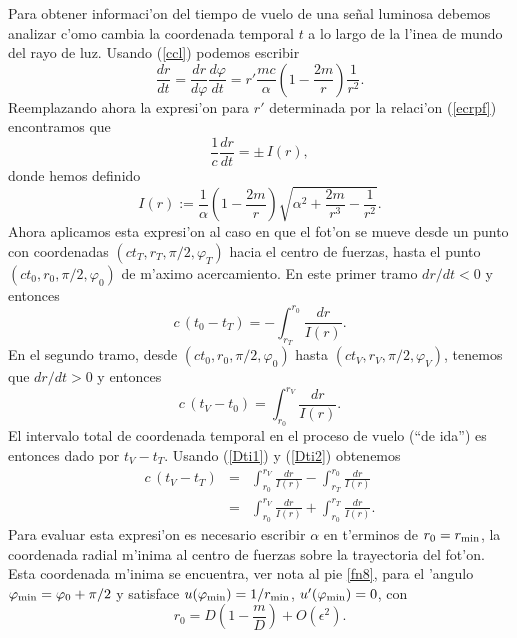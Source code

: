 Para obtener informaci'on del tiempo de vuelo de una se\~nal luminosa debemos analizar c'omo cambia la coordenada temporal $t$ a lo largo de la l'inea de mundo del rayo de luz.
Usando (\ref{ccl}) podemos escribir
\begin{equation}
\frac{dr}{dt}=\frac{dr}{d\varphi}\frac{d\varphi}{dt}=r'\frac{mc}{\alpha}\left(1-\frac{2m}{r}\right)\frac{1}{r^2}.
\end{equation}
Reemplazando ahora la expresi'on para $r'$ determinada por la relaci'on (\ref{ecrpf}) encontramos que
\begin{equation}
\frac{1}{c}\frac{dr}{dt}=\pm\, I(r),
\end{equation}
donde hemos definido
\begin{equation}
I(r):=\frac{1}{\alpha}\left(1-\frac{2m}{r}\right)\sqrt{\alpha^2+\frac{2m}{r^3}-\frac{1}{r^2}}.
\end{equation}
Ahora aplicamos esta expresi'on al caso en que el fot'on se mueve desde un punto con coordenadas $(ct_T,r_T,\pi/2,\varphi_T)$ hacia el centro de fuerzas, hasta el punto $(ct_0,r_0,\pi/2,\varphi_0)$ de m'aximo acercamiento. En este primer tramo $dr/dt<0$ y entonces
\begin{equation}\label{Dti1}
c\,(t_0-t_T)=-\int^{r_0}_{r_T}\frac{dr}{I(r)}.
\end{equation}
En el segundo tramo, desde $(ct_0,r_0,\pi/2,\varphi_0)$ hasta $(ct_V,r_V,\pi/2,\varphi_V)$, tenemos que $dr/dt>0$ y entonces
\begin{equation}\label{Dti2}
c\,(t_V-t_0)=\int_{r_0}^{r_V}\frac{dr}{I(r)}.
\end{equation}
El intervalo total de coordenada temporal en el proceso de vuelo (``de ida'') es entonces dado por $t_V-t_T$. Usando (\ref{Dti1}) y (\ref{Dti2}) obtenemos
\begin{eqnarray}
c\,(t_V-t_T)&=&\int_{r_0}^{r_V}\frac{dr}{I(r)}-\int^{r_0}_{r_T}\frac{dr}{I(r)} \\
&=&\int_{r_0}^{r_V}\frac{dr}{I(r)}+\int_{r_0}^{r_T}\frac{dr}{I(r)}. \label{cDtI}
\end{eqnarray}
Para evaluar esta expresi'on es necesario escribir $\alpha$ en t'erminos de $r_0=r_{\rm min}$, la coordenada radial m'inima al centro de fuerzas sobre la trayectoria del fot'on. Esta coordenada m'inima se encuentra, ver nota al pie \ref{fn8}, para el 'angulo $\varphi_{\rm min}=\varphi_0+\pi/2$ y satisface $u(\varphi_{\rm min})=1/r_{\rm min}$, $u'(\varphi_{\rm min})=0$, con
\begin{equation}
 r_0=D\left(1-\frac{m}{D}\right)+O(\epsilon^2).
\end{equation}
